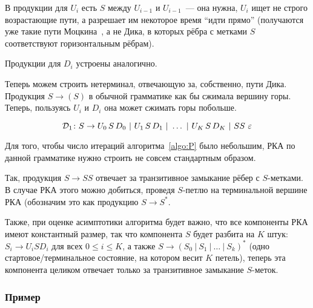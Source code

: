 В продукции для $U_i$ есть $S$ между $U_{i-1}$ и $U_{i-1}$~--- она нужна, $U_i$ ищет не строго возрастающие пути, а разрешает им некоторое время ``идти прямо'' (получаются уже такие пути Моцкина~\cite{Donaghey1977}, а не Дика, в которых рёбра с метками $S$ соответствуют горизонтальным рёбрам).

Продукции для $D_i$ устроены аналогично.

Теперь можем строить нетерминал, отвечающую за, собственно, пути Дика. Продукция $S \to ( S )$ в обычной грамматике как бы сжимала вершину горы. Теперь, пользуясь $U_i$ и $D_i$ она может сжимать горы побольше.

\begin{equation}\label{eq:S}
  \mathcal{D}_1 \colon S \rightarrow U_0\, S\, D_0~|~U_1\, S\, D_1~|~ \dots ~|~U_K\, S\, D_K~|~SS~\varepsilon
\end{equation}

Для того, чтобы число итераций алгоритма~\ref{algo:P} было небольшим, РКА по данной грамматике нужно строить не совсем стандартным образом.

Так, продукция $S \to SS$ отвечает за транзитивное замыкание рёбер с $S$-метками. В случае РКА этого можно добиться, проведя $S$-петлю на терминальной вершине РКА (обозначим это как продукцию $S \to S^*$.

Также, при оценке асимптотики алгоритма будет важно, что все компоненты РКА имеют константный размер, так что компонента $S$ будет разбита на $K$ штук: $S_i \to U_i S D_i$ для всех $0 \le i \le K$, а также $S \to (S_0~|~S_1~|~ \dots ~|~ S_k)^*$ (одно стартовое/терминальное состояние, на котором весит $K$ петель), теперь эта компонента целиком отвечает только за транзитивное замыкание $S$-меток.

\subsubsection{Пример}

